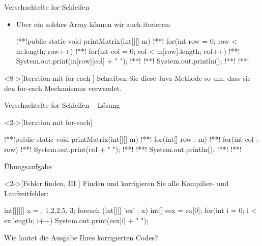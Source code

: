 \begin{frame}[fragile]{Verschachtelte for-Schleifen}
    \begin{itemize}[<+(1)->]
        \widei
        \item Über ein solches Array können wir auch iterieren:\pause{}
\begin{plainjava}
!**!public static void printMatrix(int[][] m){
!**!    for(int row = 0; row < m.length; row++) {
!**!        for(int col = 0; col < m[row].length; col++) {
!**!            System.out.print(m[row][col] + " ");
!**!        }
!**!        System.out.println();
!**!    }
!**!}
\end{plainjava}
    \end{itemize}
\ifull
    \begin{exercise}<8->[Iteration mit for-each ]
        Schreiben Sie diese Java-Methode so um, dass sie den for-each Mechanismus verwendet.
    \end{exercise}
\fi
\end{frame}

\ifull
\begin{frame}[c,fragile]{Verschachtelte for-Schleifen -- Lösung}
    \begin{solve}<2->[Iteration mit for-each]
\begin{plainjava}
!**!public static void printMatrix(int[][] m){
!**!    for(int[] row : m) {
!**!        for(int col : row) {
!**!            System.out.print(col + " ");
!**!        }
!**!        System.out.println();
!**!    }
!**!}
\end{plainjava}
    \end{solve}
\end{frame}
\fi

\ifull
\begin{frame}[c,fragile]{Übungsaufgabe}
    \begin{exercise}<2->[Fehler finden, III ]
        \pause{}Finden und korrigieren Sie alle Kompilier- und Laufzeitfehler:\pause{}
        \begin{plainvoid}
int[][][] x = {{}, {{1,2},{2},{5}}, {{3}}};
foreach (int[][] 'ex' : x) {
    int[] eex = ex[0];
    for(int i = 0; i < ex.length; i++)
        System.out.print(eex[i] + " ");
}
        \end{plainvoid}
        Wie lautet die Ausgabe Ihres korrigierten Codes?
    \end{exercise}
\end{frame}

